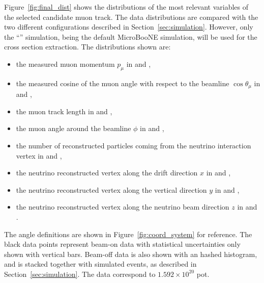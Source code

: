 Figure~\ref{fig:final_dist} shows the distributions of the most relevant variables of the selected candidate muon track. The data distributions are compared with the two different \g configurations described in Section~\ref{sec:simulation}. However, only the ``\tuneone'' simulation, being the default MicroBooNE simulation,  will be used for the cross section extraction. The distributions shown are:
\begin{itemize} 
\item the measured muon momentum $p_\mu$ in  and ,
\item the measured cosine of the muon angle with respect to the beamline $\cos\theta_\mu$ in  and ,
\item the muon track length in  and ,
\item the muon angle around the beamline $\phi$ in  and ,
\item the number of reconstructed particles coming from the neutrino interaction vertex in  and ,
\item the neutrino reconstructed vertex along the drift direction $x$ in  and ,
\item the neutrino reconstructed vertex along the vertical direction $y$ in  and ,
\item the neutrino reconstructed vertex along the neutrino beam direction $z$ in  and .
\end{itemize}
The angle definitions are shown in Figure~\ref{fig:coord_system} for reference. The black data points represent beam-on data with statistical uncertainties only shown with vertical bars. Beam-off data is also shown with an hashed histogram, and is stacked together with simulated events, as described in Section~\ref{sec:simulation}. The data correspond to $1.592 \times 10^{20}$ \acrshort{pot}.
%

